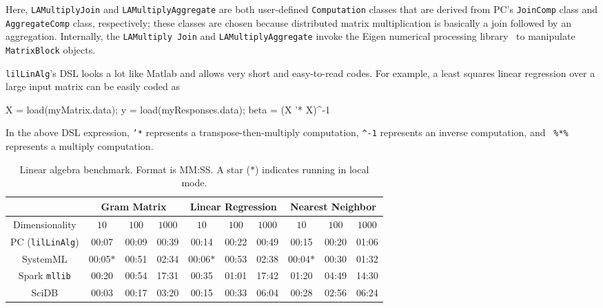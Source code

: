 \noindent Here, \texttt{LAMultiplyJoin} and \texttt{LAMultiplyAggregate} are 
both user-defined \texttt{Computation} classes that are
derived from PC's \texttt{JoinComp} class and \texttt{AggregateComp} class, respectively; these classes are chosen 
because distributed matrix multiplication
is basically a join followed by an aggregation.
Internally, the \texttt{LAMultiply Join}
and \texttt{LAMultiplyAggregate} invoke the Eigen numerical processing
library~\cite{eigen} to manipulate \texttt{MatrixBlock} objects.

\texttt{lilLinAlg}'s DSL looks a lot like Matlab and allows very short and easy-to-read codes.
For example, 
a least squares linear regression over a large input matrix can be easily coded as

\begin{codesmall}
X = load(myMatrix.data); 
y = load(myResponses.data); 
beta = (X '* X)^-1 %
\end{codesmall}

\noindent In the above DSL expression, \texttt{'*} represents a transpose-then-multiply computation,
\texttt{\^{}-1} represents an inverse computation, and \texttt{ \%*\%}
represents a multiply computation. 

\begin{table}[h]
\small
\begin{center}
\begin{tabular}{|c||c|c|c||c|c|c||c|c|c||}
\hline
& \multicolumn{3}{c||}{Gram Matrix} & \multicolumn{3}{c||}{Linear Regression} & \multicolumn{3}{c|}{Nearest Neighbor} \\
\hline
Dimensionality & $10$ & $100$ & $1000$& $10$ & $100$ & $1000$& $10$ & $100$ & $1000$ \\
\hline
\hline
PC (\texttt{lilLinAlg}) &00:07 & 00:09 &00:39 &00:14 &00:22 &00:49& 00:15 & 00:20 & 01:06 \\
SystemML &00:05$*$ &00:51 &02:34 &00:06$*$ &00:53 &02:38 &00:04$*$ &00:30 &01:32 \\
Spark \texttt{mllib} &00:20  &00:54 &17:31 &00:35 &01:01 &17:42 &01:20 & 04:49 &14:30 \\
SciDB   &00:03 &00:17 &03:20 &00:15 &00:33 &06:04 &00:28 &02:56 & 06:24 \\
\hline
\end{tabular}
\caption{Linear algebra benchmark. Format is MM:SS.
A star ($*$) indicates running in local mode.}
\label{fig:LR}
\end{center}
\vspace{-20pt}
\end{table}

